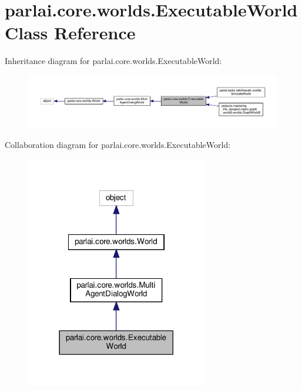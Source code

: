 \hypertarget{classparlai_1_1core_1_1worlds_1_1ExecutableWorld}{}\section{parlai.\+core.\+worlds.\+Executable\+World Class Reference}
\label{classparlai_1_1core_1_1worlds_1_1ExecutableWorld}


Inheritance diagram for parlai.\+core.\+worlds.\+Executable\+World\+:
\nopagebreak
\begin{figure}[H]
\begin{center}
\leavevmode
\includegraphics[width=350pt]{de/d9f/classparlai_1_1core_1_1worlds_1_1ExecutableWorld__inherit__graph}
\end{center}
\end{figure}


Collaboration diagram for parlai.\+core.\+worlds.\+Executable\+World\+:
\nopagebreak
\begin{figure}[H]
\begin{center}
\leavevmode
\includegraphics[width=225pt]{d8/da3/classparlai_1_1core_1_1worlds_1_1ExecutableWorld__coll__graph}
\end{center}
\end{figure}
